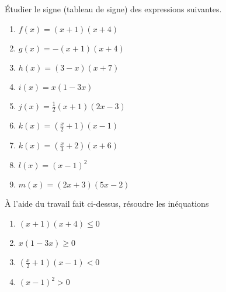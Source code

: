 
\begin{exercice}\label{exoPremiere-0062}

    Étudier le signe (tableau de signe) des expressions suivantes.
    \begin{multicols}{3}
        \begin{enumerate}
            \item
                \( f(x)=(x+1)(x+4)\)
            \item
                \( g(x)=-(x+1)(x+4)\)
            \item
                \( h(x)=(3-x)(x+7)\)
            \item
                \( i(x)=x(1-3x)\)
            \item
                \( j(x)=\frac{ 1 }{2}(x+1)(2x-3)\)
            \item
                \( k(x)=(\frac{ x }{ 2 }+1)(x-1)\)
            \item
                \( k(x)=(\frac{ x }{ 3 }+2)(x+6)\)
            \item
                \( l(x)=(x-1)^2\)
            \item
                \( m(x)=(2x+3)(5x-2)\)
        \end{enumerate}
    \end{multicols}
    
    À l'aide du travail fait ci-dessus, résoudre les inéquations
    \begin{multicols}{2}
        \begin{enumerate}
            \item
                \( (x+1)(x+4)\leq 0\)
            \item
                \( x(1-3x)\geq 0\)
            \item
                \( (\frac{ x }{2}+1)(x-1)<0\)
            \item
                \( (x-1)^2>0\)
        \end{enumerate}
    \end{multicols}

\end{exercice}
